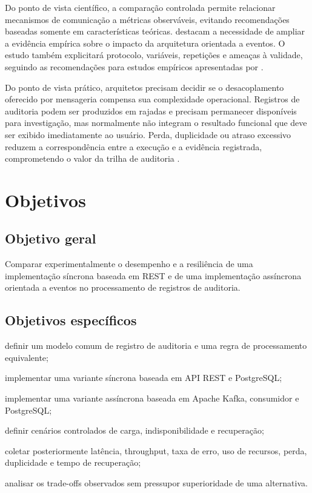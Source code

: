 Do ponto de vista científico, a comparação controlada permite relacionar mecanismos de comunicação a métricas observáveis, evitando recomendações baseadas somente em características teóricas.  destacam a necessidade de ampliar a evidência empírica sobre o impacto da arquitetura orientada a eventos. O estudo também explicitará protocolo, variáveis, repetições e ameaças à validade, seguindo as recomendações para estudos empíricos apresentadas por .

Do ponto de vista prático, arquitetos precisam decidir se o desacoplamento oferecido por mensageria compensa sua complexidade operacional. Registros de auditoria podem ser produzidos em rajadas e precisam permanecer disponíveis para investigação, mas normalmente não integram o resultado funcional que deve ser exibido imediatamente ao usuário. Perda, duplicidade ou atraso excessivo reduzem a correspondência entre a execução e a evidência registrada, comprometendo o valor da trilha de auditoria \cite{amir2016}.

\section{Objetivos}

\subsection{Objetivo geral}

Comparar experimentalmente o desempenho e a resiliência de uma implementação síncrona baseada em REST e de uma implementação assíncrona orientada a eventos no processamento de registros de auditoria.

\subsection{Objetivos específicos}

\begin{alineas}
\item definir um modelo comum de registro de auditoria e uma regra de processamento equivalente;
\item implementar uma variante síncrona baseada em API REST e PostgreSQL;
\item implementar uma variante assíncrona baseada em Apache Kafka, consumidor e PostgreSQL;
\item definir cenários controlados de carga, indisponibilidade e recuperação;
\item coletar posteriormente latência, throughput, taxa de erro, uso de recursos, perda, duplicidade e tempo de recuperação;
\item analisar os trade-offs observados sem pressupor superioridade de uma alternativa.
\end{alineas}

